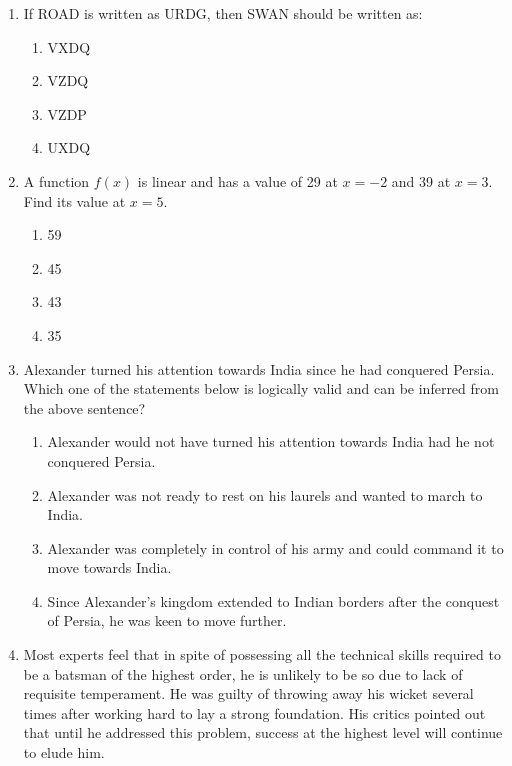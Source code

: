 \documentclass[journal]{IEEEtran}
\begin{document}
\begin{enumerate}
    \item If ROAD is written as URDG, then SWAN should be written as:
    \begin{enumerate}
        \item VXDQ
        \item VZDQ
        \item VZDP
        \item UXDQ
    \end{enumerate}

    \item A function $f(x)$ is linear and has a value of 29 at $x = -2$ and 39 at $x = 3$. Find its value at $x = 5$.
     \begin{multicols}{4}
    \begin{enumerate}
        \item 59
        \item 45
        \item 43
        \item 35
    \end{enumerate}
      \end{multicols}

    \item Alexander turned his attention towards India since he had conquered Persia. Which one of the statements below is logically valid and can be inferred from the above sentence?
    \begin{enumerate}
        \item Alexander would not have turned his attention towards India had he not conquered Persia.
        \item Alexander was not ready to rest on his laurels and wanted to march to India.
        \item Alexander was completely in control of his army and could command it to move towards India.
        \item Since Alexander’s kingdom extended to Indian borders after the conquest of Persia, he was keen to move further.
    \end{enumerate}
     

\item Most experts feel that in spite of possessing all the technical skills required to be a batsman of the highest order, he is unlikely to be so due to lack of requisite temperament. He was guilty of throwing away his wicket several times after working hard to lay a strong foundation. His critics pointed out that until he addressed this problem, success at the highest level will continue to elude him.\\



\end{enumerate}
\end{document}
